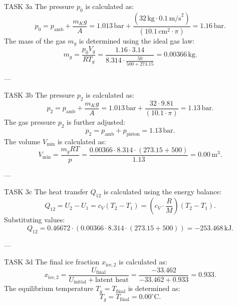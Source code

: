 TASK 3a  
The pressure \( p_0 \) is calculated as:  
\[
p_0 = p_{\text{amb}} + \frac{m_K g}{A} = 1.013 \, \text{bar} + \frac{(32 \, \text{kg} \cdot 0.1 \, \text{m/s}^2)}{(10.1 \, \text{cm}^2 \cdot \pi)} = 1.16 \, \text{bar}.
\]  
The mass of the gas \( m_g \) is determined using the ideal gas law:  
\[
m_g = \frac{p_0 V_g}{R T_g} = \frac{1.16 \cdot 3.14}{8.314 \cdot \frac{50}{500 + 273.15}} = 0.00366 \, \text{kg}.
\]  

---

TASK 3b  
The pressure \( p_2 \) is calculated as:  
\[
p_2 = p_{\text{amb}} + \frac{m_K g}{A} = 1.013 \, \text{bar} + \frac{32 \cdot 9.81}{(10.1 \cdot \pi)} = 1.13 \, \text{bar}.
\]  
The gas pressure \( p_2 \) is further adjusted:  
\[
p_2 = p_{\text{amb}} + p_{\text{piston}} = 1.13 \, \text{bar}.
\]  
The volume \( V_{\text{min}} \) is calculated as:  
\[
V_{\text{min}} = \frac{m_g R T}{p} = \frac{0.00366 \cdot 8.314 \cdot (273.15 + 500)}{1.13} = 0.00 \, \text{m}^3.
\]  

---

TASK 3c  
The heat transfer \( Q_{12} \) is calculated using the energy balance:  
\[
Q_{12} = U_2 - U_1 = c_V (T_2 - T_1) = \left(c_V \cdot \frac{R}{M}\right) (T_2 - T_1).
\]  
Substituting values:  
\[
Q_{12} = 0.46672 \cdot (0.00366 \cdot 8.314 \cdot (273.15 + 500)) = -253.468 \, \text{kJ}.
\]  

---

TASK 3d  
The final ice fraction \( x_{\text{ice},2} \) is calculated as:  
\[
x_{\text{ice},2} = \frac{U_{\text{final}}}{U_{\text{initial}} + \text{latent heat}} = \frac{-33.462}{-33.462 + 0.933} = 0.933.
\]  
The equilibrium temperature \( T_g = T_{\text{final}} \) is determined as:  
\[
T_g = T_{\text{final}} = 0.00^\circ \text{C}.
\]  